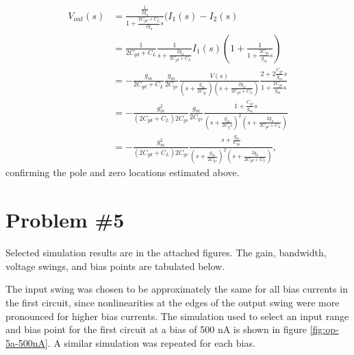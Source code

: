 \documentclass{article}
\begin{document}
\begin{enumerate}
{       \begin{align*}
       V_{out}(s) &= \frac{\frac{1}{2g_d}}{1 + \frac{2 C_{gd} + C_L}{2g_d} s} 
                     (I_1(s) - I_2(s) \\
                  &= \frac{1}{2 C_{gd} + C_L}
                     \frac{1}{s + \frac{2 g_d}{2 C_{gd} + C_L}}
                     I_1(s)\left(1 + \frac{1}{1 + \frac{2 C_{gs}}{g_m} s}\right) \\
                  &= -\frac{g_m}{2 C_{gd} + C_L}
                      \frac{g_m}{2 C_{gs}}
                      \frac{V(s)}{(s + \frac{g_m}{2 C_{gs}})
                                  (s + \frac{2 g_d}{2 C_{gd} + C_L})}
                      \frac{2 + 2\frac{C_{gs}}{g_m} s}
                           {1 + \frac{2 C_{gs}}{g_m} s} \\
                  &= -\frac{g_m^2}{(2 C_{gd} + C_L)2C_{gs}}
                      \frac{g_m}{2 C_{gs}}
                      \frac{1 + \frac{C_{gs}}{g_m}s}
                           {(s + \frac{g_m}{2 C_gs})^2
                            (s + \frac{2g_d}{2 C_{gd} + C_L})} \\
                  &= -\frac{g_m^2}{(2 C_{gd} + C_L)2 C_{gs}}
                      \frac{s + \frac{g_m}{C_{gs}}}
                           {(s + \frac{g_m}{2 C_{gs}})^2
                            (s + \frac{2 g_d}{2 C_{gd} + C_L})},
       \end{align*}
       confirming the pole and zero locations estimated above.
       }
\end{enumerate}

\pagebreak

\section*{Problem \#5}
Selected simulation results are in the attached figures. The gain, bandwidth, 
voltage swings, and bias points are tabulated below. 

The input swing was chosen to be approximately the same for all bias currents
in the first circuit, since nonlinearities at the edges of the output swing 
were more pronounced for higher bias currents. The simulation used to select
an input range and bias point for the first circuit at a bias of 500 nA is
shown in figure \ref{fig:op-5a-500nA}. A similar simulation was repeated for
each bias.
\end{document}
